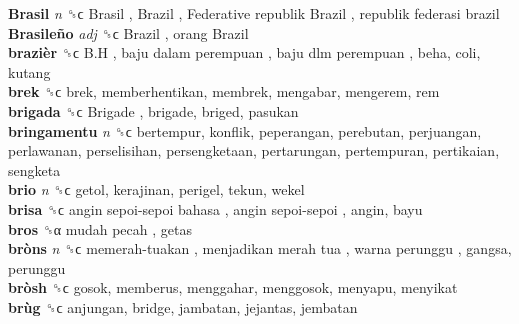 \textbf{Brasil} \emph{n}  ␝ϲ   Brasil ,  Brazil ,  Federative republik Brazil ,  republik federasi brazil   \\
\textbf{Brasileño} \emph{adj}  ␝ϲ   Brazil ,  orang Brazil   \\
\textbf{brazièr} ␝ϲ   B.H ,  baju dalam perempuan ,  baju dlm perempuan , beha, coli, kutang  \\
\textbf{brek} ␝ϲ  brek, memberhentikan, membrek, mengabar, mengerem, rem  \\
\textbf{brigada} ␝ϲ   Brigade , brigade, briged, pasukan  \\
\textbf{bringamentu} \emph{n}  ␝ϲ  bertempur, konflik, peperangan, perebutan, perjuangan, perlawanan, perselisihan, persengketaan, pertarungan, pertempuran, pertikaian, sengketa  \\
\textbf{brio} \emph{n}  ␝ϲ  getol, kerajinan, perigel, tekun, wekel  \\
\textbf{brisa} ␝ϲ   angin sepoi-sepoi bahasa ,  angin sepoi-sepoi , angin, bayu  \\
\textbf{bros} ␝α   mudah pecah , getas  \\
\textbf{bròns} \emph{n}  ␝ϲ   memerah-tuakan ,  menjadikan merah tua ,  warna perunggu , gangsa, perunggu  \\
\textbf{bròsh} ␝ϲ  gosok, memberus, menggahar, menggosok, menyapu, menyikat  \\
\textbf{brùg} ␝ϲ  anjungan, bridge, jambatan, jejantas, jembatan  \\
